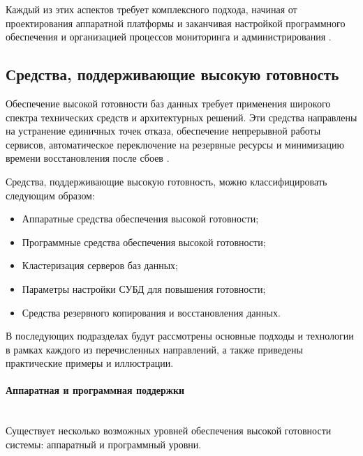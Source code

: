 Каждый из этих аспектов требует комплексного подхода, начиная от проектирования аппаратной платформы и заканчивая настройкой программного обеспечения и организацией процессов мониторинга и администрирования \autocite{Kleppmann}.

\subsection{Средства, поддерживающие высокую готовность}

Обеспечение высокой готовности баз данных требует применения широкого спектра технических средств и архитектурных решений. Эти средства направлены на устранение единичных точек отказа, обеспечение непрерывной работы сервисов, автоматическое переключение на резервные ресурсы и минимизацию времени восстановления после сбоев \autocites{RajeshKumar}{SameerParadkar}.

Средства, поддерживающие высокую готовность, можно классифицировать следующим образом:
\begin{itemize}
    \item Аппаратные средства обеспечения высокой готовности;
    \item Программные средства обеспечения высокой готовности;
    \item Кластеризация серверов баз данных;
    \item Параметры настройки СУБД для повышения готовности;
    \item Средства резервного копирования и восстановления данных.
\end{itemize}

В последующих подразделах будут рассмотрены основные подходы и технологии в рамках каждого из перечисленных направлений, а также приведены практические примеры и иллюстрации.


\paragraph{Аппаратная и программная поддержки} ~\\
Существует несколько возможных уровней обеспечения высокой готовности системы: аппаратный и программный уровни. \\
